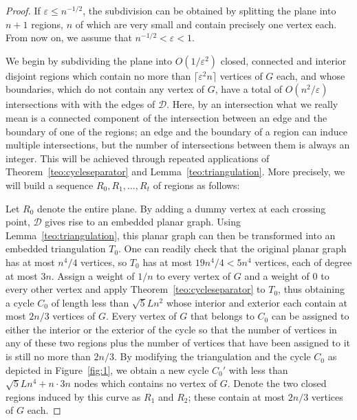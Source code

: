 \documentclass{article}
\begin{document}
\begin{proof}
    If $\varepsilon\leq n^{-1/2}$, the subdivision can be obtained by splitting the plane into $n+1$ regions, $n$ of which are very small and contain precisely one vertex each. From now on, we assume that $n^{-1/2}<\varepsilon<1$.
    
    We begin by subdividing the plane into $O(1/\varepsilon^2)$ closed, connected and interior disjoint regions which contain no more than $\lceil\varepsilon^2 n\rceil$ vertices of $G$ each, and whose boundaries, which do not contain any vertex of $G$, have a total of $O(n^2/\varepsilon)$ intersections with with the edges of $\mathcal D$. Here, by an intersection what we really mean is a connected component of the intersection between an edge and the boundary of one of the regions; an edge and the boundary of a region can induce multiple intersections, but the number of intersections between them is always an integer. This will be achieved through repeated applications of Theorem~\ref{teo:cycleseparator} and Lemma~\ref{teo:triangulation}. More precisely, we will build a sequence $R_0,R_1,\dots,R_t$ of regions as follows: 
    
    Let $R_0$ denote the entire plane. By adding a dummy vertex at each crossing point, $\mathcal{D}$ gives rise to an embedded planar graph. Using Lemma~\ref{teo:triangulation}, this planar graph can then be transformed into an embedded triangulation $T_0$. One can readily check that the original planar graph has at most $n^4/4$ vertices, so $T_0$ has at most $19n^4/4< 5n^4$ vertices, each of degree at most $3n$. Assign a weight of $1/n$ to every vertex of $G$ and a weight of $0$ to every other vertex and apply Theorem~\ref{teo:cycleseparator} to $T_0$, thus obtaining a cycle $C_0$ of length less than $\sqrt{5}Ln^2$ whose interior and exterior each contain at most $2n/3$ vertices of $G$. Every vertex of $G$ that belongs to $C_0$ can be assigned to either the interior or the exterior of the cycle so that the number of vertices in any of these two regions plus the number of vertices that have been assigned to it is still no more than $2n/3$. By modifying the triangulation and the cycle $C_0$ as depicted in Figure~\ref{fig:1}, we obtain a new cycle $C_0'$ with less than $\sqrt{5}Ln^4+n\cdot 3n$ nodes which contains no vertex of $G$. Denote the two closed regions induced by this curve as $R_1$ and $R_2$; these contain at most $2n/3$ vertices of $G$ each. 


\end{proof}
\end{document}
